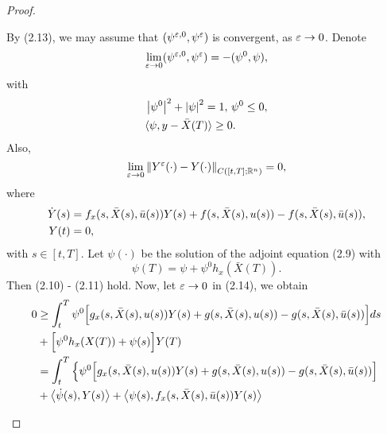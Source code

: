 \begin{proof}
\begin{asparaenum}
            By (2.13), we may assume that $(\psi^{\varepsilon, 0}, \psi^{\varepsilon})$ is 
            convergent, as $\varepsilon \to 0$. Denote
            \begin{equation*}
                \lim_{\varepsilon\to 0}(\psi^{\varepsilon, 0}, \psi^{\varepsilon}) = -(\psi^{0}, \psi),
            \end{equation*}
            with
            \begin{equation*}
                \begin{aligned}
                    &\left\lvert\psi^{0}\right\rvert^2 + \left\lvert\psi\right\rvert^2 = 1, \, \psi^{0} \leq 0, \\
                    &\langle \psi, y - \bar{X}(T) \rangle \geq 0.
                \end{aligned}
            \end{equation*}
            Also,
            \begin{equation*}
                \lim_{\veps \to 0} \norm{Y^{\veps}(\cdot) - Y(\cdot)}_{C([t,T]; %
                \mathbb{R}^{n})} = 0,
            \end{equation*}
            where
            \begin{align*}
                \Dot{Y}(s) &= f_x(s, \bar{X}(s), \Bar{u}(s))Y(s) + f(s, \bar{X}(s), u(s))
                    - f(s, \bar{X}(s), \Bar{u}(s)), \\
                Y(t) &= 0,
            \end{align*}
            with $s \in [t,T]$.
            Let $\psi(\cdot)$ be the solution of the adjoint equation (2.9) with
            \begin{equation*}
                \psi(T) = \psi + \psi^{0}h_x(\bar{X}(T)).
            \end{equation*}
            Then (2.10) - (2.11) hold. Now, let $\varepsilon \to 0$ in (2.14), we obtain
            \begin{align*}
                0 &\geq \int_{t}^{T}\psi^{0}\Big[g_x(s, \bar{X}(s), u(s))Y(s) + %
                    g(s, \bar{X}(s), u(s)) - g(s, \bar{X}(s), \Bar{u}(s))\Big]ds \\
                &+ \Big[ \psi^{0}h_x(X(T)) + \psi(s) \Big]Y(T) \\
                &=  \int_{t}^{T}\Big\{\psi^{0}\Big[g_x(s, \bar{X}(s), u(s)) Y(s) %
                    + g(s, \bar{X}(s), u(s)) - g(s, \bar{X}(s), \bar{u}(s))\Big] \\
                &+ \big\langle \Dot{\psi}(s), Y(s)\big\rangle + %
                    \big\langle \psi(s), f_x(s, \bar{X}(s), \bar{u}(s))Y(s)\big\rangle \\

\end{align*}
\end{asparaenum}
\end{proof}
